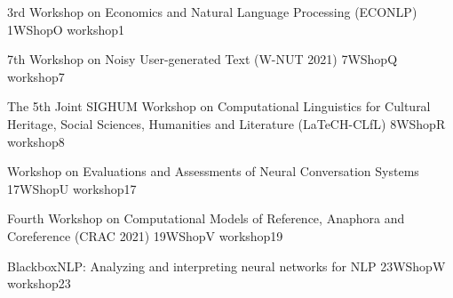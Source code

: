 

\begin{wsschedule}
  {3rd Workshop on Economics and Natural Language Processing (ECONLP)}
  {1}{WShopO}
  {workshop1}
  {\WShopLocI}
  
\end{wsschedule}


\begin{wsschedule}
  {7th Workshop on Noisy User-generated Text (W-NUT 2021)}
  {7}{WShopQ}
  {workshop7}
  {\WShopLocK}
  
\end{wsschedule}

\begin{wsschedule}
  {The 5th Joint SIGHUM Workshop on Computational Linguistics for Cultural Heritage, Social Sciences, Humanities and Literature (LaTeCH-CLfL)}
  {8}{WShopR}
  {workshop8}
  {\WShopLocL}
  
\end{wsschedule}



\begin{wsschedule}
  {Workshop on Evaluations and Assessments of Neural Conversation Systems}
  {17}{WShopU}
  {workshop17}
  {\WShopLocN}
  
\end{wsschedule}

\begin{wsschedule}
  {Fourth Workshop on Computational Models of Reference, Anaphora and Coreference (CRAC 2021)}
  {19}{WShopV}
  {workshop19}
  {\WShopLocN}
  
\end{wsschedule}

\begin{wsschedule}
  {BlackboxNLP: Analyzing and interpreting neural networks for NLP}
  {23}{WShopW}
  {workshop23}
  {\WShopLocN}
  
\end{wsschedule}


\clearpage{\thispagestyle{emptyheader}\cleardoublepage}
